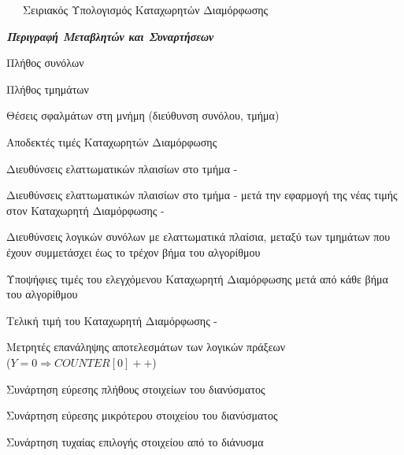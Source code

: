 \begin{algorithm}[H]
    \caption{\ \ \ Σειριακός Υπολογισμός Καταχωρητών Διαμόρφωσης}
    \label{alg:serial}
    \begin{algorithmic}[1]
        \begin{footnotesize}
            \Statex
            
            \Statex
            \begin{center}
                \textit{\textbf{Περιγραφή Μεταβλητών και Συναρτήσεων}}
            \end{center}
            
            \Statex
            \begin{description}[leftmargin=8em,style=nextline]
                \item [$SetsNumber$] Πλήθος συνόλων
                \item [$WaysNumber$] Πλήθος τμημάτων
                \item [$FaultMaps$] Θέσεις σφαλμάτων στη μνήμη (διεύθυνση συνόλου, τμήμα)
                \item [$S$] Αποδεκτές τιμές Καταχωρητών Διαμόρφωσης
                \item [$FB_{w}$] Διευθύνσεις ελαττωματικών πλαισίων στο τμήμα - 
                \item [$XFB_{w}$] Διευθύνσεις ελαττωματικών πλαισίων στο τμήμα -  μετά την εφαρμογή της νέας τιμής στον Καταχωρητή Διαμόρφωσης - 
                \item [$FS_{k}$] Διευθύνσεις λογικών συνόλων με  ελαττωματικά πλαίσια, μεταξύ των τμημάτων που έχουν συμμετάσχει έως το τρέχον βήμα του αλγορίθμου
                \item [$CCR$] Υποψήφιες τιμές του ελεγχόμενου Καταχωρητή Διαμόρφωσης μετά από κάθε βήμα του αλγορίθμου
                \item [$CR_{w}$] Τελική τιμή του Καταχωρητή Διαμόρφωσης - 
                \item [$COUNTER{[Y]}$] Μετρητές επανάληψης αποτελεσμάτων  των λογικών πράξεων \xor\\ ($Y=0 \Rightarrow COUNTER[0]++$)
                \item[$elements(A)$] Συνάρτηση εύρεσης πλήθους στοιχείων του διανύσματος 
                \item[$minimum(A)$] Συνάρτηση εύρεσης μικρότερου στοιχείου του διανύσματος 
                \item[$random(A)$] Συνάρτηση τυχαίας επιλογής στοιχείου από το διάνυσμα 
            \end{description}
            

\end{footnotesize}
\end{algorithmic}
\end{algorithm}
